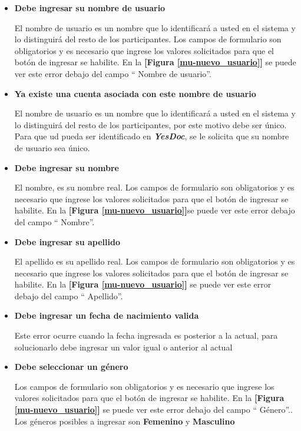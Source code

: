 \begin{itemize}
	\item \textbf{Debe ingresar su nombre de usuario}
	
	El nombre de usuario es un nombre que lo identificará a usted en el sistema y lo distinguirá del resto de los participantes.
	Los campos de formulario son obligatorios y es necesario que ingrese los valores solicitados para que el botón de ingresar se habilite. En la	\textbf{[Figura \ref{mu-nuevo_usuario}]}  se puede ver este error debajo del campo `` Nombre de usuario''.
	
	\item \textbf{Ya existe una cuenta asociada con este nombre de usuario}	
	
	El nombre de usuario es un nombre que lo identificará a usted en el sistema y lo distinguirá del resto de los participantes, por este motivo debe ser único.
	Para que ud pueda ser identificado en \textbf{\textit{YesDoc}}, se le solicita que su nombre de usuario sea único.	
	
	\item \textbf{Debe ingresar su nombre}
	
	El nombre, es su nombre real.
	Los campos de formulario son obligatorios y es necesario que ingrese los valores solicitados para que el botón de ingresar se habilite. En la	\textbf{[Figura \ref{mu-nuevo_usuario}]}se puede ver este error debajo del campo `` Nombre''.
	
	\item \textbf{Debe ingresar su apellido}
	
	El apellido es su apellido real.
	Los campos de formulario son obligatorios y es necesario que ingrese los valores solicitados para que el botón de ingresar se habilite.	En la \textbf{[Figura \ref{mu-nuevo_usuario}]} se puede ver este error debajo del campo `` Apellido''.
	
	\item \textbf{Debe ingresar un fecha de nacimiento valida}
	
Este error ocurre cuando la fecha ingresada es posterior a la actual, para solucionarlo debe ingresar un valor igual o anterior al actual

	\item \textbf{Debe seleccionar un género}
	
		Los campos de formulario son obligatorios y es necesario que ingrese los valores solicitados para que el botón de ingresar se habilite. En la	\textbf{[Figura \ref{mu-nuevo_usuario}]} se puede ver este error debajo del campo `` Género''.. Los géneros posibles a ingresar son \textbf{Femenino} y \textbf{Masculino}
		

\end{itemize}
